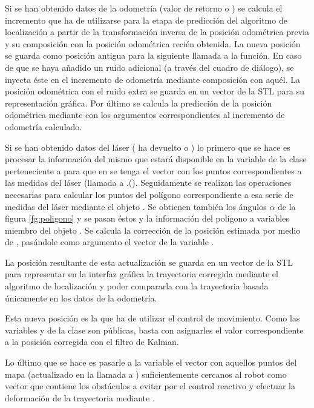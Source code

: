 Si se han obtenido datos de la odometría (valor de retorno  o ) se calcula el incremento que ha de utilizarse para la etapa de predicción del algoritmo de localización a partir de la transformación inversa de la posición odométrica previa y su composición con la posición odométrica recién obtenida. La nueva posición se guarda como posición antigua para la siguiente llamada a la función. En caso de que se haya añadido un ruido adicional (a través del cuadro de diálogo), se inyecta éste en el incremento de odometría mediante composición con aquél. La posición odométrica con el ruido extra se guarda en un vector de la STL para su representación gráfica. Por último se calcula la predicción de la posición odométrica mediante  con los argumentos correspondientes al incremento de odometría calculado.

Si se han obtenido datos del láser ( ha devuelto  o ) lo primero que se hace es procesar la información del mismo que estará disponible en la variable de la clase  perteneciente a  para que en  se tenga el vector  con los puntos correspondientes a las medidas del láser (llamada a .().
Seguidamente se realizan las operaciones necesarias para calcular los puntos del polígono correspondiente a esa serie de medidas del láser mediante el objeto . Se obtienen también los ángulos $\alpha$ de la figura \ref{fg:poligono} y se pasan éstos y la información del polígono a variables miembro del objeto . Se calcula la corrección de la posición estimada por medio de , pasándole como argumento el vector  de la variable .

La posición resultante de esta actualización se guarda en un vector de la STL para representar en la interfaz gráfica la trayectoria corregida mediante el algoritmo de localización y poder compararla con la trayectoria basada únicamente en los datos de la odometría.

Esta nueva posición es la que ha de utilizar el control de movimiento. Como las variables  y  de la clase  son públicas, basta con asignarles el valor correspondiente a la posición corregida con el filtro de Kalman.

Lo último que se hace es pasarle a la variable  el vector con aquellos puntos del mapa (actualizado en la llamada a ) suficientemente cercanos al robot como vector que contiene los obstáculos a evitar por el control reactivo y efectuar la deformación de la trayectoria mediante .

